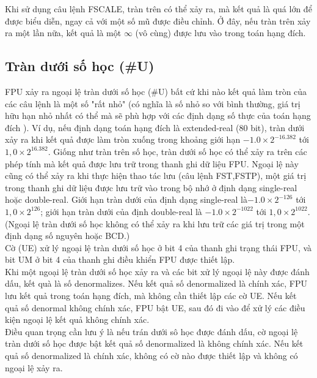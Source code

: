 	Khi sử dụng câu lệnh FSCALE, tràn trên có thể xảy ra, mà kết quả là quá lớn để được biểu diễn, ngay cả với một số mũ được điều chỉnh. Ở đây, nếu tràn trên xảy ra một lần nữa, kết quả là một $\mathbb{\infty}$ (vô cùng) được lưu vào trong toán hạng đích.	
		\subsection*{Tràn dưới số học (\#U)}
		FPU xảy ra ngoại lệ tràn dưới số học (\#U) bất cứ khi nào kết quả làm tròn của các câu lệnh là một số "rất nhỏ" (có nghĩa là số nhỏ so với bình thường, giá trị hữu hạn nhỏ nhất có thể mà sẽ phù hợp với các định dạng số thực của toán hạng đích ). Ví dụ, nếu định dạng toán hạng đích là extended-real (80 bit), tràn dưới xảy ra khi kết quả được làm tròn xuống trong khoảng giới hạn $-1.0 \times 2^{-16.382}$ tới $1,0 \times 2^{16.382}$. Giống như tràn trên số học, tràn dưới số học có thể xảy ra trên các phép tính mà kết quả được lưu trữ trong thanh ghi dữ liệu FPU. Ngoại lệ này cũng có thể xảy ra khi thực hiện thao tác lưu (câu lệnh FST,FSTP),  một giá trị trong thanh ghi dữ liệu được lưu trữ vào trong bộ nhớ ở định dạng single-real hoặc double-real. Giới hạn tràn dưới của định dạng single-real là$-1.0 \times 2^{-126}$ tới $1,0 \times 2^{126}$; giới hạn tràn dưới của định double-real là $-1.0 \times 2^{-1022}$ tới $1,0 \times 2^{1022}$. (Ngoại lệ tràn dưới số học không có thể xảy ra khi lưu trữ các giá trị trong một định dạng số nguyên hoặc BCD.)\\
		
		Cờ (UE) xử lý ngoại lệ tràn dưới số học ở bit 4 của thanh ghi trạng thái FPU, và bit UM ở bit 4 của thanh ghi điều khiển FPU được thiết lập.\\
		
		Khi một ngoại lệ tràn dưới số học xảy ra và các bit xử lý ngoại lệ này được đánh dấu, kết quà là số denormalizes. Nếu kết quả số denormalized là chính xác, FPU lưu kết quả trong toán hạng đích, mà không cần thiết lập các cờ UE. Nếu kết quả số denormal không chính xác, FPU bật UE, sau đó đi vào để xử lý các điều kiện ngoại lệ kết quả không chính xác.\\
		
		 Điều quan trọng cần lưu ý là nếu trán dưới sô học được đánh dấu, cờ ngoại lệ tràn dưới số học được bật kết quả số denormalized là không chính xác. Nếu kết quả số denormalized là chính xác, không có cờ nào được thiết lập và không có ngoại lệ xảy ra.\\
		 
